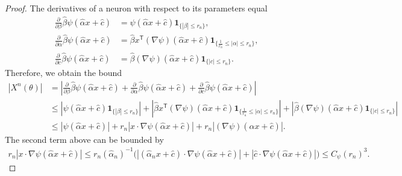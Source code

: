 \documentclass[11pt,a4paper,reqno]{amsart}
\numberwithin{equation}{section}
\theoremstyle{plain}
\theoremstyle{definition}
\newcommand{\abs}[1]{\left|#1\right|} %
\begin{document}
\begin{proof}
The derivatives of a neuron with respect to its parameters equal
\begin{align*}
\frac{\partial}{\partial \beta} \hat\beta \psi \left( \hat\alpha x + \hat c \right)
    &= \psi \left( \hat\alpha x + \hat c \right) \mathbf{1}_{ \{ \abs{\beta} \leq r_n \} }, \\
\frac{\partial}{\partial \alpha} \hat\beta \psi \left( \hat\alpha x + \hat c \right) 
    &= \hat\beta x^\mathsf{T} \left( \nabla \psi \right) \left( \hat\alpha x + \hat c \right) \mathbf{1}_{\{ \frac{1}{r_n} \leq \abs{\alpha} \leq r_n \} }, \\ 
\frac{\partial}{\partial c} \hat\beta \psi \left( \hat\alpha x + \hat c \right) 
    &= \hat\beta \left( \nabla \psi \right) \left( \hat\alpha x + \hat c \right) \mathbf{1}_{ \{ \abs{c} \leq r_n \}}.
\end{align*}
Therefore, we obtain the bound
\begin{align*}
\abs{X^n(\theta)} 
    &= \abs{\frac{\partial}{\partial \beta} \hat\beta \psi \left( \hat\alpha x + \hat c \right) +  \frac{\partial}{\partial \alpha} \hat\beta \psi \left( \hat\alpha x + \hat c \right) + \frac{\partial}{\partial c} \hat\beta \psi \left( \hat\alpha x + \hat c \right)} \\
    &\leq \abs{\psi \left( \hat\alpha x + \hat c \right) \mathbf{1}_{ \{ \abs{\beta} \leq r_n \} }} + \abs{\hat\beta x^\mathsf{T} \left( \nabla \psi \right) \left( \hat\alpha x + \hat c \right) \mathbf{1}_{\{ \frac{1}{r_n} \leq \abs{\alpha} \leq r_n \} }} + \abs{\hat\beta \left( \nabla \psi \right) \left( \hat\alpha x + \hat c \right) \mathbf{1}_{\{\abs{c} \leq r_n \} }} \\
    &\leq \abs{\psi \left( \hat\alpha x + \hat c \right)} + r_n \abs{ x\cdot\nabla \psi  \left( \hat\alpha x + \hat c \right)} + r_n \abs{\left( \nabla \psi \right) \left( \hat\alpha x + \hat c \right)}.
\end{align*}
The second term above can be bounded by 
\begin{align*}
r_n \abs{ x\cdot\nabla \psi  \left( \hat\alpha x + \hat c \right)}
    \le r_n (\hat\alpha_n)^{-1}\Big(\abs{ (\hat\alpha_n x+\hat c)\cdot\nabla \psi  \left( \hat\alpha x + \hat c \right)} + \abs{\hat c \cdot \nabla \psi  \left( \hat\alpha x + \hat c \right)} \Big)
    \le C_\psi (r_n)^3.

\end{align*}
\end{proof}
\end{document}
